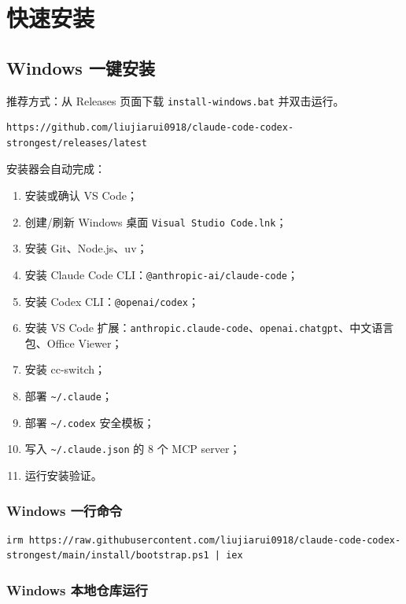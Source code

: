 \documentclass[11pt,a4paper]{ctexbook}
\begin{document}
\chapter{快速安装}

\section{Windows 一键安装}

推荐方式：从 Releases 页面下载 \texttt{install-windows.bat} 并双击运行。

\begin{lstlisting}[language={}]
https://github.com/liujiarui0918/claude-code-codex-strongest/releases/latest
\end{lstlisting}

安装器会自动完成：

\begin{enumerate}[leftmargin=2em]
  \item 安装或确认 VS Code；
  \item 创建/刷新 Windows 桌面 \texttt{Visual Studio Code.lnk}；
  \item 安装 Git、Node.js、uv；
  \item 安装 Claude Code CLI：\texttt{@anthropic-ai/claude-code}；
  \item 安装 Codex CLI：\texttt{@openai/codex}；
  \item 安装 VS Code 扩展：\texttt{anthropic.claude-code}、\texttt{openai.chatgpt}、中文语言包、Office Viewer；
  \item 安装 cc-switch；
  \item 部署 \texttt{\textasciitilde/.claude}；
  \item 部署 \texttt{\textasciitilde/.codex} 安全模板；
  \item 写入 \texttt{\textasciitilde/.claude.json} 的 8 个 MCP server；
  \item 运行安装验证。
\end{enumerate}

\subsection{Windows 一行命令}

\begin{lstlisting}[language={}]
irm https://raw.githubusercontent.com/liujiarui0918/claude-code-codex-strongest/main/install/bootstrap.ps1 | iex
\end{lstlisting}

\subsection{Windows 本地仓库运行}
\end{document}
